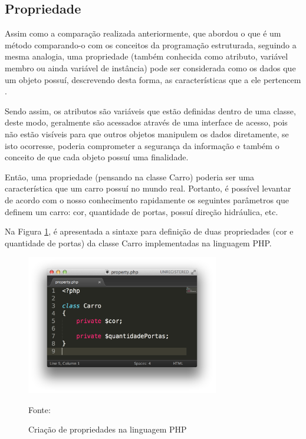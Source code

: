 \subsection{Propriedade}

Assim como a comparação realizada anteriormente, que abordou o que é um método
comparando-o com os conceitos da programação estruturada, seguindo a mesma
analogia, uma propriedade (também conhecida como atributo, variável membro ou ainda variável 
de instância) pode ser considerada como os dados que um objeto possuí, 
descrevendo desta forma, as características que a ele pertencem 
\cite{programmingPhp}.

Sendo assim, os atributos são variáveis que estão definidas dentro de uma
classe, deste modo, geralmente são acessados através de uma interface de acesso,
pois não estão visíveis para que outros objetos manipulem os dados diretamente,
se isto ocorresse, poderia comprometer a segurança da informação e também o
conceito de que cada objeto possuí uma finalidade.

Então, uma propriedade (pensando na classe Carro) poderia ser uma característica
que um carro possuí no mundo real. Portanto, é possível levantar de acordo com
o nosso conhecimento rapidamente os seguintes parâmetros que definem um carro:
cor, quantidade de portas, possuí direção hidráulica, etc.

Na Figura \ref{fig:propriedade}, é apresentada a sintaxe para definição de duas
propriedades (cor e quantidade de portas) da classe Carro implementadas na
linguagem \acs{PHP}.

\begin{figure}[h!tb]
	\caption{Criação de propriedades na linguagem PHP}
	\label{fig:propriedade}

	\centering
	\includegraphics[width=0.75\textwidth]{images/property.png}

	\centering
	\footnotesize Fonte: \fonteOAutor
\end{figure}

